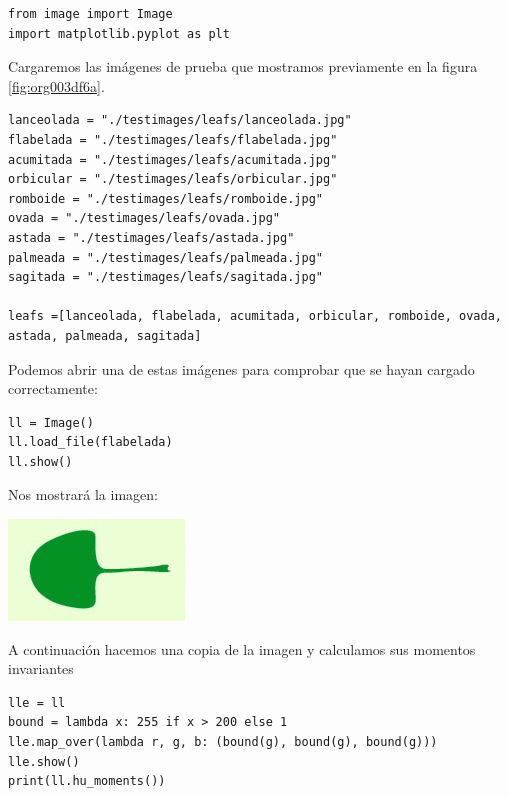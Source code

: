 \documentclass[letter]{article}
\begin{document}
\begin{verbatim}
from image import Image
import matplotlib.pyplot as plt
\end{verbatim}

Cargaremos las imágenes de prueba que mostramos previamente en la figura
\ref{fig:org003df6a}.

\begin{verbatim}
lanceolada = "./testimages/leafs/lanceolada.jpg"
flabelada = "./testimages/leafs/flabelada.jpg"
acumitada = "./testimages/leafs/acumitada.jpg"
orbicular = "./testimages/leafs/orbicular.jpg"
romboide = "./testimages/leafs/romboide.jpg"
ovada = "./testimages/leafs/ovada.jpg"
astada = "./testimages/leafs/astada.jpg"
palmeada = "./testimages/leafs/palmeada.jpg"
sagitada = "./testimages/leafs/sagitada.jpg"

leafs =[lanceolada, flabelada, acumitada, orbicular, romboide, ovada, astada, palmeada, sagitada]
\end{verbatim}

Podemos abrir una de estas imágenes para comprobar que se hayan cargado correctamente:

\begin{verbatim}
ll = Image()
ll.load_file(flabelada)
ll.show()
\end{verbatim}

Nos mostrará la imagen:

\begin{center}
\includegraphics[width=.9\linewidth]{./images/show.png}
\end{center}

A continuación hacemos una copia de la imagen y calculamos sus momentos invariantes

\begin{verbatim}
lle = ll
bound = lambda x: 255 if x > 200 else 1
lle.map_over(lambda r, g, b: (bound(g), bound(g), bound(g)))
lle.show()
print(ll.hu_moments())
\end{verbatim}
\end{document}
